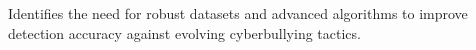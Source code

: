 Identifies the need for robust datasets and advanced algorithms to improve detection accuracy against evolving cyberbullying tactics.